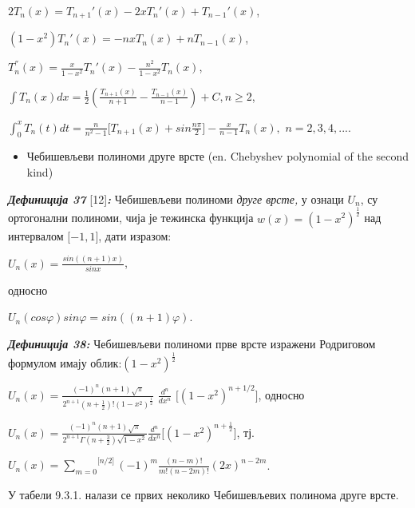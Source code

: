\(2T_{n}(x) = T_{n + 1}'(x) - 2xT_{n}'(x) + T_{n - 1}'(x)\),

\((1 - x^{2})T_{n}'(x) = - nxT_{n}(x) + nT_{n - 1}(x)\),

\(T_{n}^{''}(x) = \frac{x}{1 - x^{2}}T_{n}'(x) - \frac{n^{2}}{1 - x^{2}}T_{n}(x)\),

\(\int T_{n}(x)dx = \frac{1}{2}(\frac{T_{n + 1}(x)}{n + 1} - \frac{T_{n - 1}(x)}{n - 1}) + C,n \geq 2\),

\(\int_{0}^{x}T_{n}(t)dt = \frac{n}{n^{2} - 1}\lbrack T_{n + 1}(x) + sin\frac{n\pi}{2}\rbrack - \frac{x}{n - 1}T_{n}(x),\)
\(n = 2,3,4,...\).

\begin{itemize}
\item
  Чебишевљеви полиноми друге врсте (en. Chebyshev polynomial of the
  second kind)
\end{itemize}

\emph{\textbf{Дефиниција 37}} {[}12{]}\emph{\textbf{:}} Чебишевљеви
полиноми \emph{друге врсте,} у ознаци \(U_{n}\), су ортогонални
полиноми, чија је тежинска функција
\(w\overset{}{(x)} = {(1 - x^{2})}^{\frac{1}{2}}\) над интервалом
\(\lbrack - 1,1\rbrack\), дати изразом:

\(U_{n}(x) = \frac{sin((n + 1)x)}{sinx}\),

односно

\(U_{n}(cos\varphi)sin\varphi = sin((n + 1)\varphi)\).

\emph{\textbf{Дефиниција 38:}} Чебишевљеви полиноми прве врсте изражени
Родриговом формулом имају облик:\({(1 - x^{2})}^{\frac{1}{2}}\)

\(U_{n}(x) = \frac{{( - 1)}^{n}(n + 1)\sqrt{\pi}}{2^{n + 1}(n + \frac{1}{2})!{(1 - x^{2})}^{\frac{1}{2}}}\)
\(\frac{d^{n}}{dx^{n}}\) \(\lbrack{(1 - x^{2})}^{n + 1/2}\rbrack\),
односно

\(U_{n}(x) = \frac{{( - 1)}^{n}(n + 1)\sqrt{\pi}}{2^{n + 1}\Gamma(n + \frac{3}{2})\sqrt{1 - x^{2}}}\frac{d^{n}}{dx^{n}}\lbrack{(1 - x^{2})}^{n + \frac{1}{2}}\rbrack\),
тј.

\(U_{n}(x) = \overset{\lbrack n/2\rbrack}{\sum_{m = 0}}{( - 1)}^{m}\frac{(n - m)!}{m!(n - 2m)!}{(2x)}^{n - 2m}\).

У табели 9.3.1. налази се првих неколико Чебишевљевих полинома друге
врсте.

